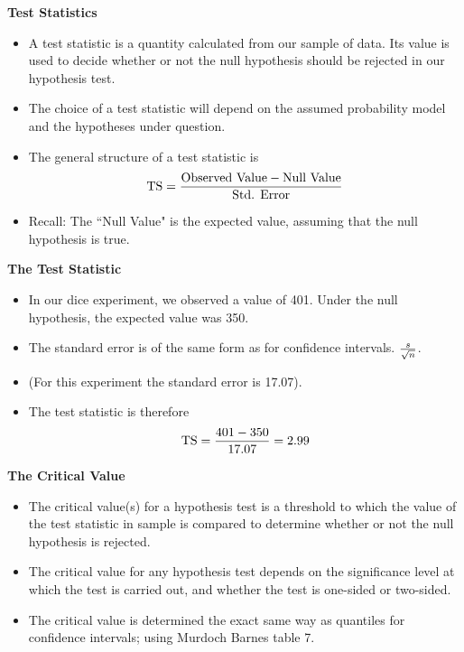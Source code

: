 \documentclass[a4]{beamer}
\begin{document}

\noindent \textbf{Test Statistics}
\begin{itemize}
\item A test statistic is a quantity calculated from our sample of data. Its value is used to decide whether or not the null hypothesis should be rejected in our hypothesis test.
\item The choice of a test statistic will depend on the assumed probability model and the hypotheses under question.
    \item The general structure of a test statistic is
\[ \mbox{TS}  = {\mbox{Observed Value} - \mbox{Null Value}  \over \mbox{Std. Error}}\]
\item Recall: The ``Null Value" is the expected value, assuming that the null hypothesis is true.
\end{itemize}



\noindent \textbf{The Test Statistic}
\begin{itemize}

\item In our dice experiment, we observed a value of 401. Under the null hypothesis, the expected value was 350.
\item The standard error is of the same form as for confidence intervals. $s \over \sqrt{n}$.
\item (For this experiment the standard error is 17.07).
\item The test statistic is therefore \[ \mbox{TS}  = {401 - 350  \over 17.07} = 2.99 \]
\end{itemize}




\noindent \textbf{The Critical Value}


\begin{itemize}
\item The critical value(s) for a hypothesis test is a threshold to which the value of the test statistic in sample is compared to determine whether or not the null hypothesis is rejected.
\item The critical value for any hypothesis test depends on the significance level at which the test is carried out, and whether the test is one-sided or two-sided.
\item The critical value is determined the exact same way as quantiles for confidence intervals; using Murdoch Barnes table 7.


\end{itemize}
\end{document}
